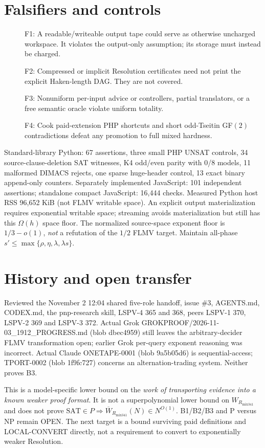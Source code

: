 \documentclass[11pt]{article}
\begin{document}
\section*{Falsifiers and controls}
\begin{description}
\item[] F1: A readable/writeable output tape could serve as otherwise uncharged workspace. It violates the output-only assumption; its storage must instead be charged.
\item[] F2: Compressed or implicit Resolution certificates need not print the explicit Haken-length DAG. They are not covered.
\item[] F3: Nonuniform per-input advice or controllers, partial translators, or a free semantic oracle violate uniform totality.
\item[] F4: Cook paid-extension PHP shortcuts and short odd-Tseitin GF$(2)$ contradictions defeat any promotion to full mixed hardness.
\end{description}
Standard-library Python: 67 assertions, three small PHP UNSAT controls, 34 source-clause-deletion SAT witnesses, K4 odd/even parity with 0/8 models, 11 malformed DIMACS rejects, one sparse huge-header control, 13 exact binary append-only counters. Separately implemented JavaScript: 101 independent assertions; standalone compact JavaScript: 16,444 checks. Measured Python host RSS 96,652 KiB (not FLMV writable space). An explicit output materialization requires exponential writable space; streaming avoids materialization but still has this $\Omega(h)$ space floor. The normalized source-space exponent floor is $1/3-o(1)$, \emph{not} a refutation of the $1/2$ FLMV target. Maintain all-phase $s'\le\max\{\rho,\eta,\lambda,\lambda s\}$.

\section*{History and open transfer}
Reviewed the November 2 12:04 shared five-role handoff, issue \#3, AGENTS.md, CODEX.md, the pnp-research skill, LSPV-4 365 and 368, peers LSPV-1 370, LSPV-2 369 and LSPV-3 372. Actual Grok GROKPROOF/2026-11-03\_1912\_PROGRESS.md (blob dbec4959) still leaves the arbitrary-decider FLMV transformation open; earlier Grok per-query exponent reasoning was incorrect. Actual Claude ONETAPE-0001 (blob 9a5b05d6) is sequential-access; TPORT-0002 (blob 1f9fc727) concerns an alternation-trading system. Neither proves B3.

This is a model-specific lower bound on the \emph{work of transporting evidence into a known weaker proof format}. It is not a superpolynomial lower bound on $W_{R_{\mathrm{mix341}}}$ and does not prove $\mathrm{SAT}\in P\Rightarrow\overline W_{R_{\mathrm{mix341}}}(N)\in N^{O(1)}$. B1/B2/B3 and P versus NP remain OPEN. The next target is a bound surviving paid definitions and LOCAL-CONVERT directly, not a requirement to convert to exponentially weaker Resolution.
\end{document}
